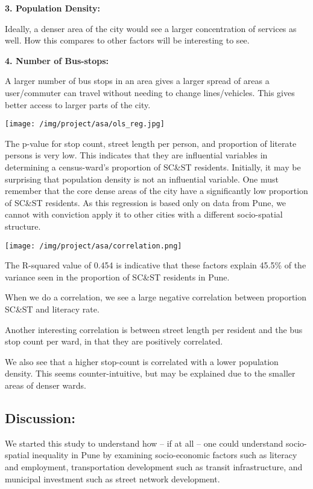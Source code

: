 \documentclass[
]{article}
\begin{document}
\textbf{3. Population Density:}

Ideally, a denser area of the city would see a larger concentration of
services as well. How this compares to other factors will be interesting
to see.

\textbf{4. Number of Bus-stops:}

A larger number of bus stops in an area gives a larger spread of areas a
user/commuter can travel without needing to change lines/vehicles. This
gives better access to larger parts of the city.

\texttt{[image: /img/project/asa/ols\_reg.jpg]}

The p-value for stop count, street length per person, and proportion of
literate persons is very low. This indicates that they are influential
variables in determining a census-ward's proportion of SC\&ST residents.
Initially, it may be surprising that population density is not an
influential variable. One must remember that the core dense areas of the
city have a significantly low proportion of SC\&ST residents. As this
regression is based only on data from Pune, we cannot with conviction
apply it to other cities with a different socio-spatial structure.

\texttt{[image: /img/project/asa/correlation.png]}

The R-squared value of 0.454 is indicative that these factors explain
45.5\% of the variance seen in the proportion of SC\&ST residents in
Pune.

When we do a correlation, we see a large negative correlation between
proportion SC\&ST and literacy rate.

Another interesting correlation is between street length per resident
and the bus stop count per ward, in that they are positively correlated.

We also see that a higher stop-count is correlated with a lower
population density. This seems counter-intuitive, but may be explained
due to the smaller areas of denser wards.

\hypertarget{discussion}{%
\subsection{Discussion:}\label{discussion}}

We started this study to understand how -- if at all -- one could
understand socio-spatial inequality in Pune by examining socio-economic
factors such as literacy and employment, transportation development such
as transit infrastructure, and municipal investment such as street
network development.
\end{document}
